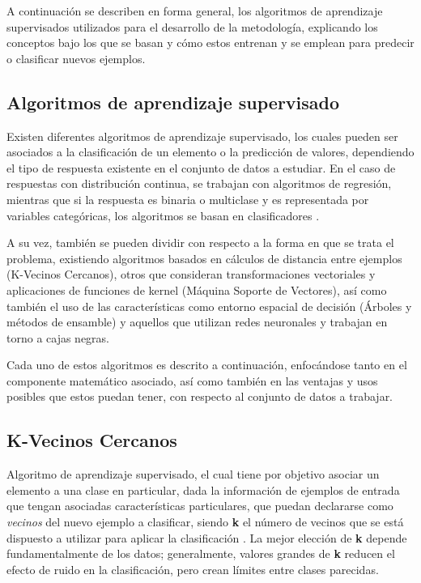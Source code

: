 A continuación se describen en forma general, los algoritmos de aprendizaje supervisados utilizados para el desarrollo de la metodología, explicando los conceptos bajo los que se basan y cómo estos entrenan y se emplean para predecir o clasificar nuevos ejemplos.

\subsection{Algoritmos de aprendizaje supervisado}

Existen diferentes algoritmos de aprendizaje supervisado, los cuales pueden ser asociados a la clasificación de un elemento o la predicción de valores, dependiendo el tipo de respuesta existente en el conjunto de datos a estudiar. En el caso de respuestas con distribución continua, se trabajan con algoritmos de regresión, mientras que si la respuesta es binaria o multiclase y es representada por variables categóricas, los algoritmos se basan en clasificadores \cite{michie1994machine}.

A su vez, también se pueden dividir con respecto a la forma en que se trata el problema, existiendo algoritmos basados en cálculos de distancia entre ejemplos (K-Vecinos Cercanos), otros que consideran transformaciones vectoriales y aplicaciones de funciones de kernel (Máquina Soporte de Vectores), así como también el uso de las características como entorno espacial de decisión (Árboles y métodos de ensamble) y aquellos que utilizan redes neuronales y trabajan en torno a cajas negras.

Cada uno de estos algoritmos es descrito a continuación, enfocándose tanto en el componente matemático asociado, así como también en las ventajas y usos posibles que estos puedan tener, con respecto al conjunto de datos a trabajar.

\subsection{K-Vecinos Cercanos}

Algoritmo de aprendizaje supervisado, el cual tiene por objetivo asociar un elemento a una clase en particular, dada la información de ejemplos de entrada que tengan asociadas características particulares, que puedan declararse como \textit{vecinos} del nuevo ejemplo a clasificar, siendo \textbf{k} el número de vecinos que se está dispuesto a utilizar para aplicar la clasificación \cite{6313426}. La mejor elección de \textbf{k} depende fundamentalmente de los datos; generalmente, valores grandes de \textbf{k} reducen el efecto de ruido en la clasificación, pero crean límites entre clases parecidas.

